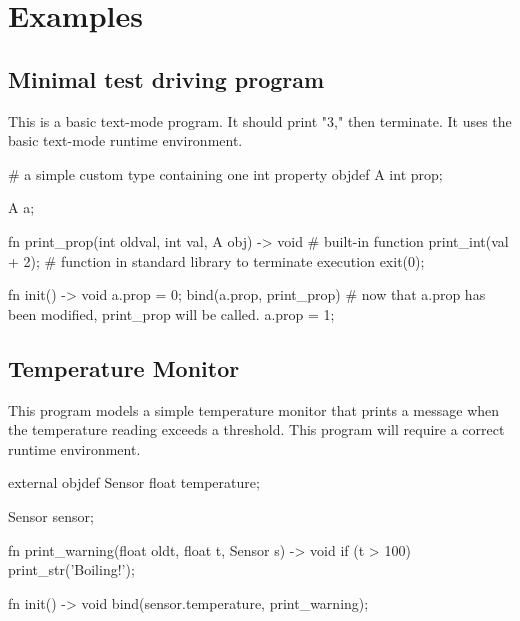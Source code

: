 \section{Examples}
\subsection{Minimal test driving program}
This is a basic text-mode program. It should print "3," then terminate.
It uses the basic text-mode runtime environment.

\vspace{-0.5cm}
\begin{mylisting}
# a simple custom type containing one int property
objdef A
{
  int prop;
}

A a;

fn print_prop(int oldval, int val, A obj) -> void
{
  # built-in function
  print_int(val + 2);
  # function in standard library to terminate execution
  exit(0);
}

fn init() -> void
{
  a.prop = 0;
  bind(a.prop, print_prop)
  # now that a.prop has been modified, print_prop will be called.
  a.prop = 1;
}
\end{mylisting}

\subsection{Temperature Monitor}
This program models a simple temperature monitor that prints a message when the temperature
reading exceeds a threshold. This program will require a correct runtime environment.

\vspace{-0.5cm}
\begin{mylisting}
external objdef Sensor
{
  float temperature;
}

Sensor sensor;

fn print_warning(float oldt, float t, Sensor s) -> void
{
  if (t > 100)
  {
    print_str('Boiling!');
  }
}

fn init() -> void
{
  bind(sensor.temperature, print_warning);
}
\end{mylisting}
